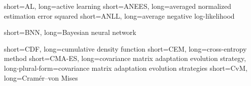 

\usepackage[]{acro}











         {short={AL},	    	long={active learning}}
      {short={ANEES},	    	long={averaged normalized estimation error squared}}
       {short={ANLL},	    	long={average negative log-likelihood}}

		{short={BNN},	    	long={Bayesian neural network}}

		{short={CDF},	    	long={cumulative density function}}
		{short={CEM},	    	long={cross-entropy method}}
	    {short={CMA-ES},	    long={covariance matrix adaptation evolution strategy}, long-plural-form={covariance matrix adaptation evolution strategies}}
		{short={CvM},	    	long={Cram\'er--von Mises}}

